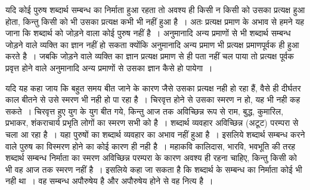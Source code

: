 {यदि कोई पुरुष शब्दार्थ सम्बन्ध का निर्माता हुआ रहता तो अवश्य ही किसी न किसी को उसका प्रत्यक्ष हुआ होता, किन्तु किसी को भी उसका प्रत्यक्ष कभी भी नहीं हुआ है~। अतः प्रत्यक्ष प्रमाण के अभाव से हमने यह जाना कि शब्दार्थ को जोड़ने वाला कोई पुरुष नहीं है~। अनुमानादि अन्य प्रमाणों से भी शब्दार्थ सम्बन्ध जोड़ने वाले व्यक्ति का ज्ञान नहीं हो सकता क्योंकि अनुमानादि अन्य प्रमाण भी प्रत्यक्ष प्रमाणपूर्वक ही हुआ करते है~। जबकि जोड़ने वाले व्यक्ति का ज्ञान प्रत्यक्ष प्रमाण से ही पता नहीं चल पाया तो प्रत्यक्ष पूर्वक प्रवृत्त होने वाले अनुमानादि अन्य प्रमाणों से उसका ज्ञान कैसे हो पायेगा~।

यदि यह कहा जाय कि बहुत समय बीत जाने के कारण जैसे उसका प्रत्यक्ष नही हो रहा हैं, वैसे ही दीर्घतर काल बीतने से उसे स्मरण भी नही हो पा रहा है~। चिरवृत्त होने से उसका स्मरण न हो, यह भी नही कह सकते~। चिरवृत्त हुए युग के युग बीत गये, किन्तु आज तक अविच्छिन्न रूप से राम, बुद्ध, कुमारिल, प्रभाकर, शंकराचार्य प्रभृति लोगों का स्मरण सभी को है~। शब्दार्थ व्यवहार अविच्छिन्न (अटूट) परम्परा से चला आ रहा है~। यहा पुरुषों का शब्दार्थ व्यवहार का अभाव नहीं हुआ है~। इसलिये शब्दार्थ सम्बन्ध करने वाले पुरुष का विस्मरण होने का कोई कारण ही नही है~। महाकवि कालिदास, भारवि, भवभूति की तरह शब्दार्थ सम्बन्ध निर्माता का स्मरण अविच्छिन्न परम्परा के कारण अवश्य ही रहना चाहिए, किन्तु किसी को भी वह आज तक स्मरण नहीं है~। इसलिये कहा जा सकता है कि शब्दार्थ के सम्बन्ध का निर्माता कोई भी नही था~। वह सम्बन्ध अपौरुषेय है और अपौरुषेय होने से वह नित्य है~। 
	
}
